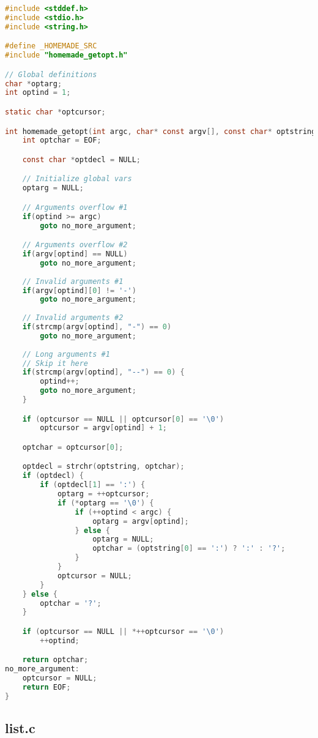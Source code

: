 \documentclass[blue,normal,cn]{elegantnote}
\begin{document}
\begin{lstlisting}[language=C]
#include <stddef.h>
#include <stdio.h>
#include <string.h>

#define _HOMEMADE_SRC
#include "homemade_getopt.h"

// Global definitions
char *optarg;
int optind = 1;

static char *optcursor;

int homemade_getopt(int argc, char* const argv[], const char* optstring) {
    int optchar = EOF;

    const char *optdecl = NULL;

    // Initialize global vars
    optarg = NULL;

    // Arguments overflow #1
    if(optind >= argc)
        goto no_more_argument;

    // Arguments overflow #2
    if(argv[optind] == NULL)
        goto no_more_argument;
    
    // Invalid arguments #1
    if(argv[optind][0] != '-')
        goto no_more_argument;
    
    // Invalid arguments #2
    if(strcmp(argv[optind], "-") == 0)
        goto no_more_argument;
    
    // Long arguments #1
    // Skip it here
    if(strcmp(argv[optind], "--") == 0) {
        optind++;
        goto no_more_argument;   
    }

    if (optcursor == NULL || optcursor[0] == '\0')
        optcursor = argv[optind] + 1;

    optchar = optcursor[0];

    optdecl = strchr(optstring, optchar);
    if (optdecl) {
        if (optdecl[1] == ':') {
            optarg = ++optcursor;
            if (*optarg == '\0') {
                if (++optind < argc) {
                    optarg = argv[optind];
                } else {
                    optarg = NULL;
                    optchar = (optstring[0] == ':') ? ':' : '?';
                }
            }
            optcursor = NULL;
        }
    } else {
        optchar = '?';
    }

    if (optcursor == NULL || *++optcursor == '\0')
        ++optind;

    return optchar;
no_more_argument:
    optcursor = NULL;
    return EOF;
}
\end{lstlisting}

\subsection{list.c}
\end{document}
